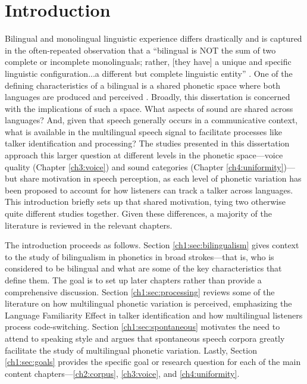 
\chapter{Introduction}\label{ch:Introduction}

Bilingual and monolingual linguistic experience differs drastically and is captured in the often-repeated observation that a ``bilingual is NOT the sum of two complete or incomplete monolinguals; rather, [they have] a unique and specific linguistic configuration...a different but complete linguistic entity'' \citep[][p. 6]{grosjean_1989_bilingual}. One of the defining characteristics of a bilingual is a shared phonetic space where both languages are produced and perceived \citep{flege_2021_slmr}. Broadly, this dissertation is concerned with the implications of such a space. What aspects of sound are shared across languages? And, given that speech generally occurs in a communicative context, what is available in the multilingual speech signal to facilitate processes like talker identification and processing? The studies presented in this dissertation approach this larger question at different levels in the phonetic space---voice quality (Chapter \ref{ch3:voice}) and sound categories (Chapter \ref{ch4:uniformity})---but share motivation in speech perception, as each level of phonetic variation has been proposed to account for how listeners can track a talker across languages. This introduction briefly sets up that shared motivation, tying two otherwise quite different studies together. Given these differences, a majority of the literature is reviewed in the relevant chapters. 

The introduction proceeds as follows. Section \ref{ch1:sec:bilingualism} gives context to the study of bilingualism in phonetics in broad strokes---that is, who is considered to be bilingual and what are some of the key characteristics that define them. The goal is to set up later chapters rather than provide a comprehensive discussion. Section \ref{ch1:sec:processing} reviews some of the literature on how multilingual phonetic variation is perceived, emphasizing the Language Familiarity Effect in talker identification and how multilingual listeners process code-switching. Section \ref{ch1:sec:spontaneous} motivates the need to attend to speaking style and argues that spontaneous speech corpora greatly facilitate the study of multilingual phonetic variation. Lastly, Section \ref{ch1:sec:goals} provides the specific goal or research question for each of the main content chapters---\ref{ch2:corpus}, \ref{ch3:voice}, and \ref{ch4:uniformity}.

